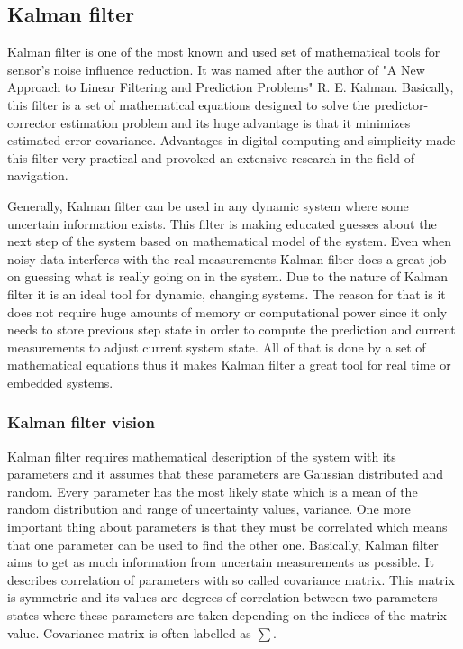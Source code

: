 \documentclass[../../main]{subfiles}
\begin{document}
\subsection{Kalman filter}

Kalman filter is one of the most known and used set of mathematical tools for sensor's noise influence reduction. It was named after the author of "A New Approach to Linear Filtering
and Prediction Problems" \cite{kalman1960} R. E. Kalman. Basically, this filter is a set of mathematical equations designed to solve the predictor-corrector estimation problem and its huge advantage is that it minimizes estimated error covariance. Advantages in digital computing and simplicity made this filter very practical and provoked an extensive research in the field of navigation.

Generally, Kalman filter can be used in any dynamic system where some uncertain information exists. This filter is making educated guesses about the next step of the system based on mathematical model of the system. Even when noisy data interferes with the real measurements Kalman filter does a great job on guessing what is really going on in the system.
Due to the nature of Kalman filter it is an ideal tool for dynamic, changing systems. The reason for that is it does not require huge amounts of memory or computational power since it only needs to store previous step state in order to compute the prediction and current measurements to adjust current system state. All of that is done by a set of mathematical equations thus it makes Kalman filter a great tool for real time or embedded systems.

\subsubsection*{Kalman filter vision}

Kalman filter requires mathematical description of the system with its parameters and it assumes that these parameters are Gaussian distributed and random. Every parameter has the most likely state which is a mean of the random distribution and range of uncertainty values, variance. One more important thing about parameters is that they must be correlated which means that one parameter can be used to find the other one. Basically, Kalman filter aims to get as much information from uncertain measurements as possible.
It describes correlation of parameters with so called covariance matrix. This matrix is symmetric and its values are degrees of correlation between two parameters states where these parameters are taken depending on the indices of the matrix value. Covariance matrix is often labelled as $\sum$.
\end{document}
